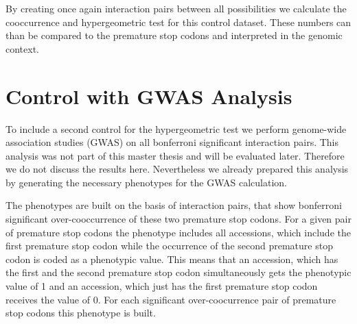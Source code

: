 By creating once again interaction pairs between all possibilities we calculate the cooccurrence and hypergeometric test for this control dataset. These numbers can than be compared to the premature stop codons and interpreted in the genomic context. 

\section{Control with GWAS Analysis}
To include a second control for the hypergeometric test we perform genome-wide association studies (GWAS) on all bonferroni significant interaction pairs. This analysis was not part of this master thesis and will be evaluated later. Therefore we do not discuss the results here. Nevertheless we already prepared this analysis by generating the necessary phenotypes for the GWAS calculation. 

The phenotypes are built on the basis of interaction pairs, that show bonferroni significant over-cooccurrence of these two premature stop codons. For a given pair of premature stop codons the phenotype includes all accessions, which include the first premature stop codon while the occurrence of the second premature stop codon is coded as a phenotypic value. This means that an accession, which has the first and the second premature stop codon simultaneously gets the phenotypic value of 1 and an accession, which just has the first premature stop codon receives the value of 0. For each significant over-coocurrence pair of premature stop codons this phenotype is built. 
